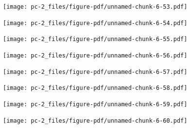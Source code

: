 \documentclass[
  letterpaper,
  DIV=11,
  numbers=noendperiod]{scrreprt}
\begin{document}
\begin{figure}[H]

{\centering \texttt{[image: pc-2\_files/figure-pdf/unnamed-chunk-6-53.pdf]}

}

\end{figure}

\begin{figure}[H]

{\centering \texttt{[image: pc-2\_files/figure-pdf/unnamed-chunk-6-54.pdf]}

}

\end{figure}

\begin{figure}[H]

{\centering \texttt{[image: pc-2\_files/figure-pdf/unnamed-chunk-6-55.pdf]}

}

\end{figure}

\begin{figure}[H]

{\centering \texttt{[image: pc-2\_files/figure-pdf/unnamed-chunk-6-56.pdf]}

}

\end{figure}

\begin{figure}[H]

{\centering \texttt{[image: pc-2\_files/figure-pdf/unnamed-chunk-6-57.pdf]}

}

\end{figure}

\begin{figure}[H]

{\centering \texttt{[image: pc-2\_files/figure-pdf/unnamed-chunk-6-58.pdf]}

}

\end{figure}

\begin{figure}[H]

{\centering \texttt{[image: pc-2\_files/figure-pdf/unnamed-chunk-6-59.pdf]}

}

\end{figure}

\begin{figure}[H]

{\centering \texttt{[image: pc-2\_files/figure-pdf/unnamed-chunk-6-60.pdf]}

}

\end{figure}
\end{document}

